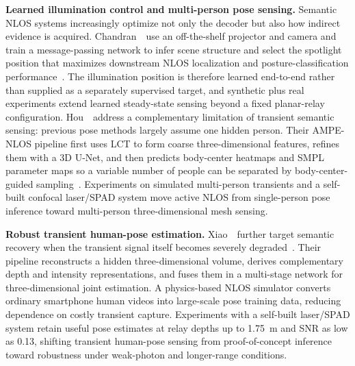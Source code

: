 \vspace{0.8mm}
\noindent \textbf{Learned illumination control and multi-person pose sensing.}
Semantic NLOS systems increasingly optimize not only the decoder but also how indirect evidence is acquired. Chandran~\etal~use an off-the-shelf projector and camera and train a message-passing network to infer scene structure and select the spotlight position that maximizes downstream NLOS localization and posture-classification performance~\cite{chandranSpotlightWACV2024}. The illumination position is therefore learned end-to-end rather than supplied as a separately supervised target, and synthetic plus real experiments extend learned steady-state sensing beyond a fixed planar-relay configuration. Hou~\etal~address a complementary limitation of transient semantic sensing: previous pose methods largely assume one hidden person. Their AMPE-NLOS pipeline first uses LCT to form coarse three-dimensional features, refines them with a 3D U-Net, and then predicts body-center heatmaps and SMPL parameter maps so a variable number of people can be separated by body-center-guided sampling~\cite{houMultiPersonPose2025}. Experiments on simulated multi-person transients and a self-built confocal laser/SPAD system move active NLOS from single-person pose inference toward multi-person three-dimensional mesh sensing.

\vspace{0.8mm}
\noindent \textbf{Robust transient human-pose estimation.}
Xiao~\etal~further target semantic recovery when the transient signal itself becomes severely degraded~\cite{xiaoNLOSHumanPose2026}. Their pipeline reconstructs a hidden three-dimensional volume, derives complementary depth and intensity representations, and fuses them in a multi-stage network for three-dimensional joint estimation. A physics-based NLOS simulator converts ordinary smartphone human videos into large-scale pose training data, reducing dependence on costly transient capture. Experiments with a self-built laser/SPAD system retain useful pose estimates at relay depths up to 1.75~m and SNR as low as 0.13, shifting transient human-pose sensing from proof-of-concept inference toward robustness under weak-photon and longer-range conditions.

